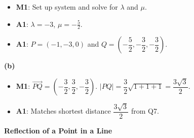 \documentclass[11pt,a4paper]{article}
\begin{document}
{\begin{itemize}[leftmargin=1.5em,itemsep=2pt]
    Ah — I see the issue. $(1,-1,1)$ is $\mathbf{d}_1\times\mathbf{d}_2$ but let me recompute: $(1,1,0)\times(0,1,1)$:
    $i(1\cdot1-0\cdot1)-j(1\cdot1-0\cdot0)+k(1\cdot1-1\cdot0)=(1-0, -(1-0), 1-0)=(1,-1,1)$.

    Actually — oh. The scalar triple product formula: the SIGNED scalar triple product is $\overrightarrow{AB}\cdot(\mathbf{d}_1\times\mathbf{d}_2)/|\mathbf{d}_1\times\mathbf{d}_2|$. Let's compute this differently using $A=(-1,-3,0)$ (the closest point on $L_1$) and $B=(-5/2,-3/2,-3/2)$ (closest on $L_2$): $\overrightarrow{AB}=(-3/2,3/2,-3/2)$. $\overrightarrow{AB}\cdot(1,-1,1)=-3/2-3/2-3/2=-9/2$. Distance = $(9/2)/\sqrt{3}=9/(2\sqrt{3})=3\sqrt{3}/2$. \checkmark 

    So the formula IS correct; I just used the wrong $A$ and $B$ before. The distance is $\frac{3\sqrt{3}}{2}$.

  \item \textbf{M1}: Set up system and solve for $\lambda$ and $\mu$.
  \item \textbf{A1}: $\lambda = -3$, $\mu = -\frac{5}{2}$.
  \item \textbf{A1}: $P = (-1,-3,0)$ and $Q = \left(-\dfrac{5}{2},-\dfrac{3}{2},-\dfrac{3}{2}\right)$.
\end{itemize}

\textbf{(b)}
\begin{itemize}[leftmargin=1.5em,itemsep=2pt]
  \item \textbf{M1}: $\overrightarrow{PQ} = \left(-\dfrac{3}{2}, \dfrac{3}{2}, -\dfrac{3}{2}\right)$.
  $|PQ| = \dfrac{3}{2}\sqrt{1+1+1} = \dfrac{3\sqrt{3}}{2}$.
  \item \textbf{A1}: Matches shortest distance $\dfrac{3\sqrt{3}}{2}$ from Q7. \checkmark
\end{itemize}
}


\vspace{10pt}

 \textbf{Reflection of a Point in a Line}

\end{document}
